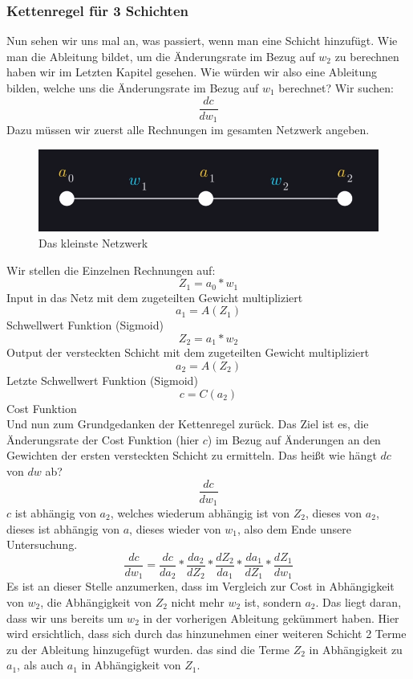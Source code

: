 \documentclass[12pt]{article}
\begin{document}
\subsubsection{Kettenregel für 3 Schichten}Nun sehen wir uns mal an, was passiert, wenn man eine Schicht hinzufügt. Wie man die Ableitung bildet, um die Änderungsrate im Bezug auf $w_2$ zu berechnen haben wir im Letzten Kapitel gesehen. Wie würden wir also eine Ableitung bilden, welche uns die Änderungsrate im Bezug auf $w_1$ berechnet?
Wir suchen:$$\frac{ dc }{ dw_{ 1 } }$$
Dazu müssen wir zuerst alle Rechnungen im gesamten Netzwerk angeben.
\begin{figure}[H]
\centering
\includegraphics[scale=0.40]{./Images/Pasted image 20230912184748.png}
\caption{Das kleinste Netzwerk}
\label{Das kleinste Netzwerk}
\end{figure}
Wir stellen die Einzelnen Rechnungen auf:
$$Z_1 = a_0*w_1$$
Input in das Netz mit dem zugeteilten Gewicht multipliziert
$$a_1=A(Z_1)$$
Schwellwert Funktion (Sigmoid)
$$Z_2=a_1*w_2$$
Output der versteckten Schicht mit dem zugeteilten Gewicht multipliziert
$$a_2=A(Z_2)$$
Letzte Schwellwert Funktion (Sigmoid)
$$c=C(a_2)$$
Cost Funktion \\Und nun zum Grundgedanken der Kettenregel zurück. Das Ziel ist es, die Änderungsrate der Cost Funktion (hier $c$) im Bezug auf Änderungen an den Gewichten der ersten versteckten Schicht zu ermitteln. Das heißt wie hängt $dc$ von $dw$ ab?
$$\frac{dc}{dw_1}$$
$c$ ist abhängig von $a_2$, welches wiederum abhängig ist von $Z_2$, dieses von $a_2$, dieses ist abhängig von $a$, dieses wieder von $w_1$, also dem Ende unsere Untersuchung.
$$\frac{ dc }{ dw_{ 1 } }=
\frac{ dc }{ da_{ 2 } }*
\frac{ da_{ 2 } }{ dZ_{ 2 } }*
\frac{ dZ_{ 2 } }{ da_{ 1 } }*
\frac{ da_{ 1 } }{ dZ_{ 1 } }*
\frac{ dZ_{ 1 } }{ dw_{ 1 } }$$
Es ist an dieser Stelle anzumerken, dass im Vergleich zur Cost in Abhängigkeit von $w_2$, die Abhängigkeit von $Z_2$ nicht mehr $w_2$ ist, sondern $a_2$. Das liegt daran, dass wir uns bereits um $w_2$ in der vorherigen Ableitung gekümmert haben.
Hier wird ersichtlich, dass sich durch das hinzunehmen einer weiteren Schicht 2 Terme zu der Ableitung hinzugefügt wurden. das sind die Terme $Z_2$ in Abhängigkeit zu $a_1$, als auch $a_1$ in Abhängigkeit von $Z_1$. 
\end{document}
